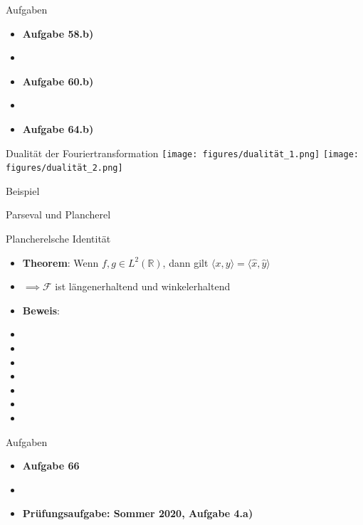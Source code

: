 \documentclass[14pt, aspectratio=169, handout]{beamer}
\begin{document}
\begin{frame}{Aufgaben}
    \begin{itemize}
        \item \textbf{Aufgabe 58.b)}
        \item[] 
        \item \textbf{Aufgabe 60.b)}
        \item[] 
        \item \textbf{Aufgabe 64.b)}
    \end{itemize}
\end{frame}

\begin{frame}{Dualität der Fouriertransformation}
    \texttt{[image: figures/dualität\_1.png]}
    \texttt{[image: figures/dualität\_2.png]}
\end{frame}

\begin{frame}{Beispiel}
    
\end{frame}

\begin{frame}{Parseval und Plancherel}
\end{frame}

\begin{frame}{Plancherelsche Identität}
    \begin{itemize}
    \item \textbf{Theorem}: Wenn $f,g \in L^2(\mathbb{R})$, dann gilt $\langle x, y\rangle = \langle \hat{x}, \hat{y}\rangle$
    \item[] $\implies \mathcal{F}$ ist längenerhaltend und winkelerhaltend
    \item \textbf{Beweis}:
    \item[]
    \item[]
    \item[]
    \item[]
    \item[]
    \item[]
    \item[]
\end{itemize}
\end{frame}

\begin{frame}{Aufgaben}
    \begin{itemize}
        \item \textbf{Aufgabe 66}
        \item[]
        \item \textbf{Prüfungsaufgabe: Sommer 2020, Aufgabe 4.a)}
    \end{itemize}
\end{frame}
\end{document}
